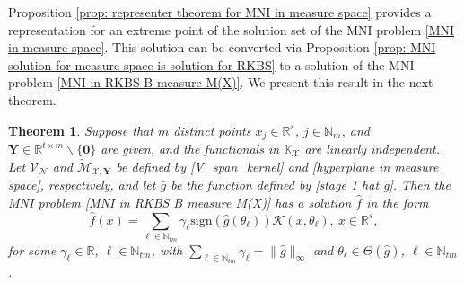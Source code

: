 \documentclass[11pt]{article}
\newtheorem{theorem}{Theorem}
\begin{document}
Proposition \ref{prop: representer theorem for MNI  in measure space} provides a representation for an extreme point of the solution set of the MNI problem \eqref{MNI in measure space}. This solution can be converted via Proposition \ref{prop: MNI solution for measure space is solution for RKBS} to a solution of the MNI problem \eqref{MNI in RKBS B measure M(X)}. We present this result in the next theorem.

\begin{theorem}\label{theorem: kernel representer theorem for MNI in BN}
Suppose that $m$ distinct points $x_j\in\mathbb{R}^s$, $j\in\mathbb{N}_m$, and $\mathbf{Y}\in\mathbb{R}^{t\times m}\backslash\{\mathbf{0}\}$ are given, and the functionals in $\mathbb{K}_\mathcal{X}$ are linearly independent. Let $\mathcal{V}_{\mathcal{N}}$ and $\widetilde{\mathcal{M}}_{\mathcal{X},\mathbf{Y}}$ be defined by \eqref{V_span_kernel} and \eqref{hyperplane in measure space}, respectively, and let $\hat g$ be the function defined by \eqref{stage 1 hat g}. Then the MNI problem \eqref{MNI in RKBS B measure M(X)} has a solution $\hat f$ in the form
\begin{equation}\label{representer solution of finite linear combination of MNI}
\hat f(x)=\sum\limits_{\ell\in\mathbb{N}_{tm}}\gamma_\ell\mathrm{sign}(\hat g(\theta_\ell))\mathcal{K}(x,\theta_\ell),\ x\in\mathbb{R}^s,
\end{equation}  
for some $\gamma_\ell\in\mathbb{R}$, $\ell\in\mathbb{N}_{tm}$, with  $\sum_{\ell\in\mathbb{N}_{tm}}\gamma_\ell=\|\hat g\|_{\infty}$ and $\theta_\ell\in\Theta(\hat g)$, $\ell\in\mathbb{N}_{tm}$.
\end{theorem}

%
%
%
%
%
%
\end{document}
